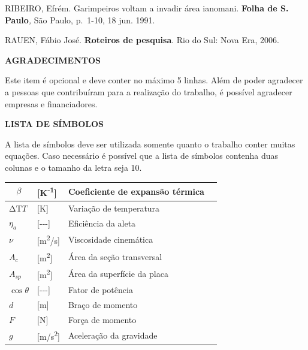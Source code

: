 \documentclass[
]{article}
\begin{document}
RIBEIRO, Efrém. Garimpeiros voltam a invadir área ianomani.
\textbf{Folha de S. Paulo}\emph{,} São Paulo, p.~1-10, 18 jun. 1991.

RAUEN, Fábio José. \textbf{Roteiros de pesquisa}. Rio do Sul: Nova Era,
2006.

\textbf{AGRADECIMENTOS}

Este item é opcional e deve conter no máximo 5 linhas. Além de poder
agradecer a pessoas que contribuíram para a realização do trabalho, é
possível agradecer empresas e financiadores.

\textbf{LISTA DE SÍMBOLOS}

A lista de símbolos deve ser utilizada somente quanto o trabalho conter
muitas equações. Caso necessário é possível que a lista de símbolos
contenha duas colunas e o tamanho da letra seja 10.

\begin{longtable}[]{@{}
  >{\raggedright\arraybackslash}p{}
  >{\raggedright\arraybackslash}p{}
  >{\raggedright\arraybackslash}p{}
  >{\raggedright\arraybackslash}p{}@{}}
\toprule\noalign{}
\begin{minipage}[b]{\linewidth}\raggedright
\[\beta\]
\end{minipage} & \begin{minipage}[b]{\linewidth}\raggedright
{[}K\textsuperscript{-1}{]}
\end{minipage} & \begin{minipage}[b]{\linewidth}\raggedright
Coeficiente de expansão térmica
\end{minipage} & \begin{minipage}[b]{\linewidth}\raggedright
\end{minipage} \\
\midrule\noalign{}
\endhead
\bottomrule\noalign{}
\endlastfoot
\(\mathrm{ΔT}T\) & {[}K{]} & Variação de temperatura & \\
\(\eta_{a}\) & {[}-\/-\/-{]} & Eficiência da aleta & \\
\(\nu\) & {[}m\textsuperscript{2}/s{]} & Viscosidade cinemática & \\
\(A_{c}\) & {[}m\textsuperscript{2}{]} & Área da seção transversal & \\
\(A_{sp}\) & {[}m\textsuperscript{2}{]} & Área da superfície da placa
& \\
\(\cos\theta\) & {[}-\/-\/-{]} & Fator de potência & \\
\(d\) & {[}m{]} & Braço de momento & \\
\(F\) & {[}N{]} & Força de momento & \\
\(g\) & {[}m/s\textsuperscript{2}{]} & Aceleração da gravidade & \\
\end{longtable}
\end{document}
